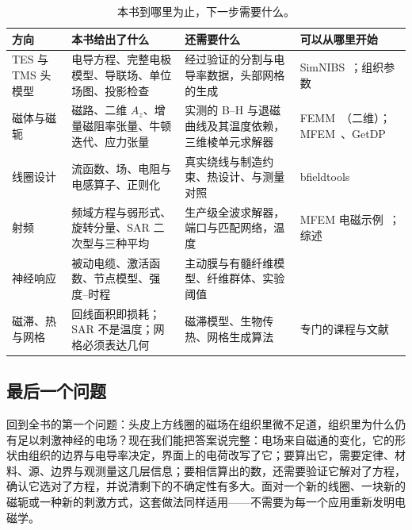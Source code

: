 \begin{table}[htbp]\centering\small
\caption{本书到哪里为止，下一步需要什么。}\label{tab:practice-next}
\begin{tabularx}{\linewidth}{@{}>{\raggedright\arraybackslash}p{.14\linewidth} Y Y >{\raggedright\arraybackslash}p{.2\linewidth}@{}}
\toprule
方向 & 本书给出了什么 & 还需要什么 & 可以从哪里开始\\\midrule
TES 与 TMS 头模型 & 电导方程、完整电极模型、导联场、单位场图、投影检查 & 经过验证的分割与电导率数据，头部网格的生成 & SimNIBS~\cite{simnibs}；组织参数~\cite{itislf,itisdielectric}\\
磁体与磁轭 & 磁路、二维 $A_z$、增量磁阻率张量、牛顿迭代、应力张量 & 实测的 B--H 与退磁曲线及其温度依赖，三维棱单元求解器 & FEMM~\cite{femm}（二维）；MFEM~\cite{mfem}、GetDP~\cite{getdp}\\
线圈设计 & 流函数、场、电阻与电感算子、正则化 & 真实绕线与制造约束、热设计、与测量对照 & bfieldtools~\cite{bfieldtheory,bfieldsoftware}\\
射频 & 频域方程与弱形式、旋转分量、SAR 二次型与三种平均 & 生产级全波求解器，端口与匹配网络，温度 & MFEM 电磁示例~\cite{mfemem}；综述~\cite{rf}\\
神经响应 & 被动电缆、激活函数、节点模型、强度--时程 & 主动膜与有髓纤维模型、纤维群体、实验阈值 & \cite{rattay,davids}\\
磁滞、热与网格 & 回线面积即损耗；SAR 不是温度；网格必须表达几何 & 磁滞模型、生物传热、网格生成算法 & 专门的课程与文献\\
\bottomrule
\end{tabularx}
\end{table}

\subsection{最后一个问题}
回到全书的第一个问题：头皮上方线圈的磁场在组织里微不足道，组织里为什么仍有足以刺激神经的电场？现在我们能把答案说完整：电场来自磁通的变化，它的形状由组织的边界与电导率决定，界面上的电荷改写了它；要算出它，需要定律、材料、源、边界与观测量这几层信息；要相信算出的数，还需要验证它解对了方程，确认它选对了方程，并说清剩下的不确定性有多大。面对一个新的线圈、一块新的磁轭或一种新的刺激方式，这套做法同样适用——不需要为每一个应用重新发明电磁学。

